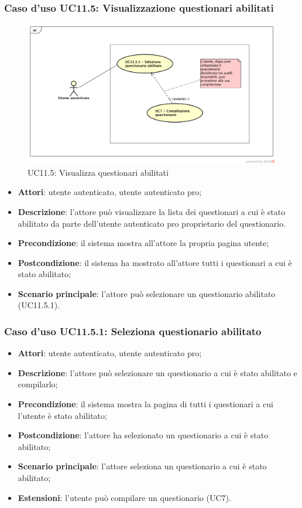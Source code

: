 \subsubsection{Caso d'uso UC11.5: Visualizzazione questionari abilitati}
\label{UC11.5}
\begin{figure}[h]
	\centering
	\includegraphics[scale=0.5]{UML/UC11_5.png}
	\caption{UC11.5: Visualizza questionari abilitati}
\end{figure}
\begin{itemize}
\item\textbf{Attori}: utente autenticato, utente autenticato pro;
\item\textbf{Descrizione}: l'attore può visualizzare la lista dei questionari a cui è stato abilitato da parte dell'utente autenticato pro proprietario del questionario.
\item\textbf{Precondizione}: il sistema mostra all'attore la propria pagina utente;
\item\textbf{Postcondizione}: il sistema ha mostrato all'attore tutti i questionari a cui è stato abilitato;
\item\textbf{Scenario principale}: l'attore può selezionare un questionario abilitato (UC11.5.1).
\end{itemize}

\subsubsection{Caso d'uso UC11.5.1: Seleziona questionario abilitato}
\begin{itemize}
\item\textbf{Attori}: utente autenticato, utente autenticato pro;
\item\textbf{Descrizione}: l'attore può selezionare un questionario a cui è stato abilitato e compilarlo;
\item\textbf{Precondizione}: il sistema mostra la pagina di tutti i questionari a cui l'utente è stato abilitato;
\item\textbf{Postcondizione}: l'attore ha selezionato un questionario a cui è stato abilitato;
\item\textbf{Scenario principale}: l'attore seleziona un questionario a cui è stato abilitato;
\item \textbf{Estensioni}: l'utente può compilare un questionario (UC7).
\end{itemize}

